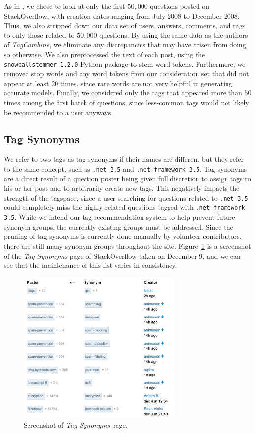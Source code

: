 \documentclass[10pt]{IEEEtran}
\begin{document}
As in \cite{1}, we chose to look at only the first $50,000$ questions posted on StackOverflow, with creation dates ranging from July 2008 to December 2008. Thus, we also stripped down our data set of users, answers, comments, and tags to only those related to $50,000$ questions. By using the same data as the authors of \textit{TagCombine}, we eliminate any discrepancies that may have arisen from doing so otherwise. We also preprocessed the text of each post, using the \texttt{snowballstemmer-1.2.0} Python package to stem word tokens. Furthermore, we removed stop words and any word tokens from our consideration set that did not appear at least $20$ times, since rare words are not very helpful in generating accurate models. Finally, we considered only the tags that appeared more than $50$ times among the first batch of questions, since less-common tags would not likely be recommended to a user anyways.

\subsection{Tag Synonyms}

We refer to two tags as tag synonyms if their names are different but they refer to the same concept, such as \texttt{.net-3.5} and \texttt{.net-framework-3.5}. Tag synonyms are a direct result of a question poster being given full discretion to assign tags to his or her post and to arbitrarily create new tags. This negatively impacts the strength of the tagspace, since a user searching for questions related to \texttt{.net-3.5} could completely miss the highly-related questions tagged with \texttt{.net-framework-3.5}. While we intend our tag recommendation system to help prevent future synonym groups, the currently existing groups must be addressed.  Since the pruning of tag synonyms is currently done manually by volunteer contributors, there are still many synonym groups throughout the site. Figure~\ref{fig:syn} is a screenshot of the \textit{Tag Synonyms} page of StackOverflow taken on December 9, and we can see that the maintenance of this list varies in consistency.

\begin{figure}[h]
  \centering
    \includegraphics[width=3.2in]{tagsynonyms_so.jpg}
  \caption{Screenshot of \textit{Tag Synonyms} page.}
  \label{fig:syn}
\end{figure}
\end{document}
